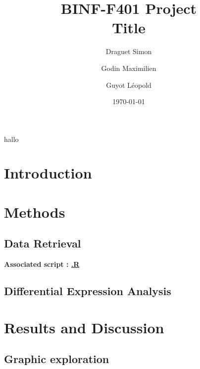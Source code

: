 \documentclass[a4paper, 11pt]{article}
\title{\Large BINF-F401 Project \\
\huge Title}
\author{
	Draguet Simon
	\and
	Godin Maximilien
	\and
	Guyot Léopold
	}
\date{\today}
\begin{document}
\pagestyle{fancy}
\setlength{\headheight}{32.3pt}
\fancyhead{}\fancyfoot{}
\fancyfoot[R]{\thepage}

\maketitle

\begin{multicols}{2}
	hallo
\section{Introduction}
\lipsum

\section{Methods}
\lipsum[4]
\subsection{Data Retrieval}
\begin{scriptsize}
	\textbf{Associated script : \href{https://github.com/leopoldguyot/BINF-F401-Project/*}{.R}}
\end{scriptsize}

\lipsum[4]
\subsection{Differential Expression Analysis}
\lipsum[4]

\section{Results and Discussion}
\lipsum
\subsection{Graphic exploration}
\lipsum[5]



\end{multicols}
\end{document}
